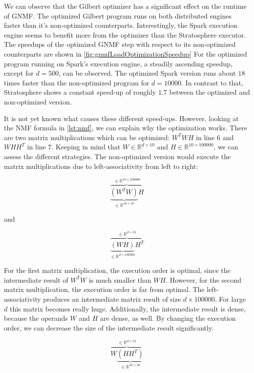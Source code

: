 We can observe that the Gilbert optimizer has a significant effect on the runtime of GNMF.
The optimized Gilbert program runs on both distributed engines faster than it's non-optimized counterparts.
Interestingly, the Spark execution engine seems to benefit more from the optimizer than the Stratosphere executor.
The speedups of the optimized GNMF step with respect to its non-optimized counterparts are shown in \cref{fig:gnmfLoadOptimizationSpeedup}
For the optimized program running on Spark's execution engine, a steadily ascending speedup, except for $d=500$, can be observed.
The optimized Spark version runs about $18$ times faster than the non-optimized program for $d=10000$.
In contrast to that, Stratosphere shows a constant speed-up of roughly $1.7$ between the optimized and non-optimized version.

It is not yet known what causes these different speed-ups.
However, looking at the NMF formula in \cref{lst:nmf}, we can explain why the optimization works.
There are two matrix multiplications which can be optimized: $W^T WH$ in line $6$ and $WHH^T$ in line $7$.
Keeping in mind that $W\in \mathbb{R}^{d\times 10}$ and $H\in \mathbb{R}^{10 \times 100000}$, we can assess the different strategies.
The non-optimized version would execute the matrix multiplications due to left-associativity from left to right:

\begin{displaymath}
	\overbrace{\underbrace{\left(W^T W\right)}_{\in \mathbb{R}^{10\times 10}}H}^{\in\mathbb{R}^{10\times 100000}}
\end{displaymath}

and

\begin{displaymath}
	\overbrace{\underbrace{\left(WH\right)}_{\in \mathbb{R}^{d \times 100000}}H^T}^{\in \mathbb{R}^{d\times 10}}
\end{displaymath}

For the first matrix multiplication, the execution order is optimal, since the intermediate result of $W^T W$ is much smaller than $WH$.
However, for the second matrix multiplication, the execution order is far from optimal.
The left-associativity produces an intermediate matrix result of size $d\times 100000$.
For large $d$ this matrix becomes really huge.
Additionally, the intermediate result is dense, because the operands $W$ and $H$ are dense, as well.
By changing the execution order, we can decrease the size of the intermediate result significantly.

\begin{displaymath}
	\overbrace{W\underbrace{\left(HH^T\right)}_{\in \mathbb{R}^{10 \times 10}}}^{\in \mathbb{R}^{d\times 10}}
\end{displaymath}


